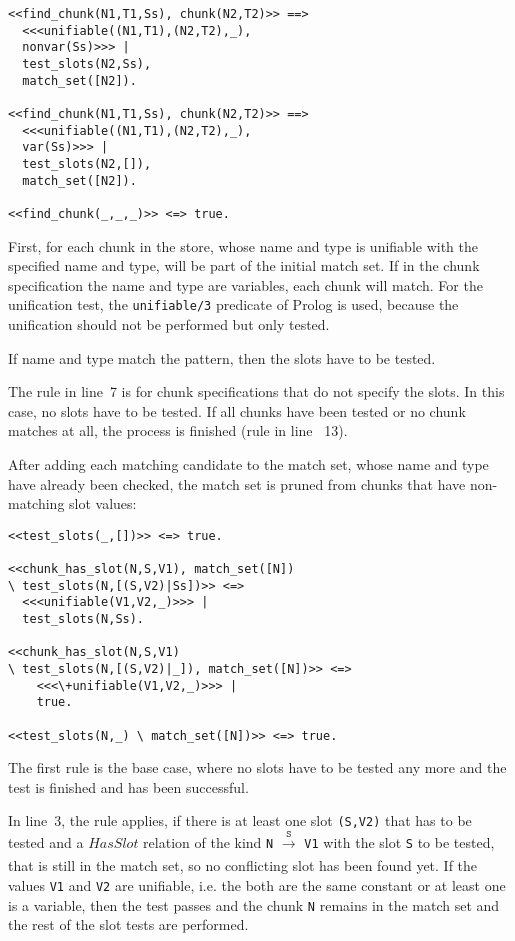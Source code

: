 \begin{lstlisting}
<<find_chunk(N1,T1,Ss), chunk(N2,T2)>> ==> 
  <<<unifiable((N1,T1),(N2,T2),_), 
  nonvar(Ss)>>> | 
  test_slots(N2,Ss), 
  match_set([N2]).
  
<<find_chunk(N1,T1,Ss), chunk(N2,T2)>> ==> 
  <<<unifiable((N1,T1),(N2,T2),_), 
  var(Ss)>>> | 
  test_slots(N2,[]), 
  match_set([N2]).

<<find_chunk(_,_,_)>> <=> true.
\end{lstlisting}

First, for each chunk in the store, whose name and type is unifiable with the specified name and type, will be part of the initial match set. If in the chunk specification the name and type are variables, each chunk will match. For the unification test, the \lstinline|unifiable/3| predicate of Prolog is used, because the unification should not be performed but only tested. 

If name and type match the pattern, then the slots have to be tested.

The rule in line~7 is for chunk specifications that do not specify the slots. In this case, no slots have to be tested. If all chunks have been tested or no chunk matches at all, the process is finished (rule in line ~13).

After adding each matching candidate to the match set, whose name and type have already been checked, the match set is pruned from chunks that have non-matching slot values:

\begin{lstlisting}
<<test_slots(_,[])>> <=> true.

<<chunk_has_slot(N,S,V1), match_set([N]) 
\ test_slots(N,[(S,V2)|Ss])>> <=> 
  <<<unifiable(V1,V2,_)>>> | 
  test_slots(N,Ss).

<<chunk_has_slot(N,S,V1) 
\ test_slots(N,[(S,V2)|_]), match_set([N])>> <=> 
    <<<\+unifiable(V1,V2,_)>>> | 
    true.

<<test_slots(N,_) \ match_set([N])>> <=> true.
\end{lstlisting}

The first rule is the base case, where no slots have to be tested any more and the test is finished and has been successful.

In line~3, the rule applies, if there is at least one slot \lstinline|(S,V2)| that has to be tested and a $HasSlot$ relation of the kind \lstinline|N| $\xrightarrow[]{\mathtt{S}}$ \lstinline|V1| with the slot \lstinline|S| to be tested, that is still in the match set, so no conflicting slot has been found yet. If the values \lstinline|V1| and \lstinline|V2| are unifiable, i.e. the both are the same constant or at least one is a variable, then the test passes and the chunk \lstinline|N| remains in the match set and the rest of the slot tests are performed.

